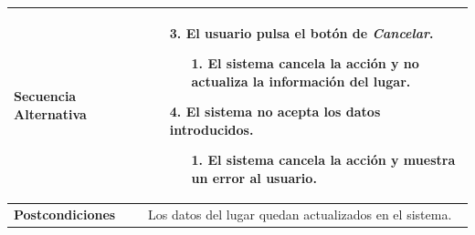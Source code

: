 \begin{longtable}{| p{4cm} | p{10cm} |}
\\
\hline
\textbf{Secuencia Alternativa} &\mbox{}\par\vspace{-\baselineskip}
\begin{enumerate}[leftmargin=0.9cm, topsep=0.1cm]
\item[3.] El usuario pulsa el botón de \textit{Cancelar}.
	\begin{itemize}
	\item[1.] El sistema cancela la acción y no actualiza la información del lugar.
	\end{itemize}
\item[4.] El sistema no acepta los datos introducidos.
	\begin{itemize}
	\item[1.] El sistema cancela la acción y muestra un error al usuario.
	\end{itemize}
\end{enumerate}
\\

\hline
\textbf{Postcondiciones} & 
Los datos del lugar quedan actualizados en el sistema.\\
\hline
\end{longtable}



\newpage
